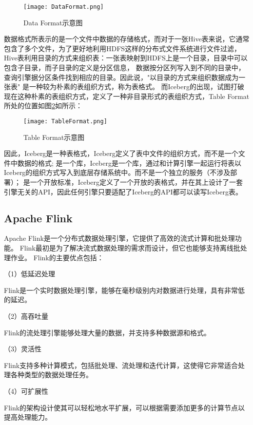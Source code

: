 \begin{figure}[H]
  \centering
  \texttt{[image: DataFormat.png]}
  \caption{Data Format示意图}
  \label{fig:DataFormat}
\end{figure}

数据格式所表示的是一个文件中数据的存储格式，而对于一张Hive表来说，它通常包含了多个文件，为了更好地利用HDFS\cite{13}这样的分布式文件系统进行文件过滤，
Hive表利用目录的方式来组织表：一张表映射到HDFS上是一个目录，目录中可以包含子目录，而子目录的定义是分区信息，
数据按分区列写入到不同的目录中，查询引擎据分区条件找到相应的目录。因此说，"以目录的方式来组织数据成为一张表"
是一种较为朴素的表组织方式，称为表格式。
而Iceberg的出现，试图打破现在这种朴素的表组织方式，定义了一种非目录形式的表组织方式，Table Format所处的位置如图\ref{fig:TableFormat}如所示：

\begin{figure}[H]
  \centering
  \texttt{[image: TableFormat.png]}
  \caption{Table Format示意图}
  \label{fig:TableFormat}
\end{figure}

因此，Iceberg是一种表格式，Iceberg定义了表中文件的组织方式，而不是一个文件中数据的格式;
是一个库，Iceberg是一个库，通过和计算引擎一起运行将表以Iceberg的组织方式写入到底层存储系统中\cite{26}。而不是一个独立的服务（不涉及部署）；
是一个开放标准，Iceberg定义了一个开放的表格式，并在其上设计了一套引擎无关的API，因此任何引擎只要适配了Iceberg的API都可以读写Iceberg表。

\subsection{Apache Flink}

Apache Flink是一个分布式数据处理引擎，它提供了高效的流式计算和批处理功能。
Flink最初是为了解决流式数据处理的需求而设计，但它也能够支持离线批处理作业\cite{24}。
Flink的主要优点包括：

（1）低延迟处理

Flink是一个实时数据处理引擎，能够在毫秒级别内对数据进行处理，具有非常低的延迟。

（2）高吞吐量

Flink的流处理引擎能够处理大量的数据，并支持多种数据源和格式。

（3）灵活性

Flink支持多种计算模式，包括批处理、流处理和迭代计算，这使得它非常适合处理各种类型的数据处理任务。

（4）可扩展性

Flink的架构设计使其可以轻松地水平扩展，可以根据需要添加更多的计算节点以提高处理能力。

